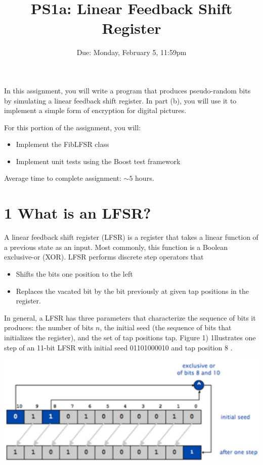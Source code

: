 \documentclass[10pt]{article}
\title{PS1a: Linear Feedback Shift Register }
\author{Due: Monday, February 5, 11:59pm}
\date{}
\begin{document}
\maketitle
In this assignment, you will write a program that produces pseudo-random bits by simulating a linear feedback shift register. In part (b), you will use it to implement a simple form of encryption for digital pictures.

For this portion of the assignment, you will:

\begin{itemize}
  \item Implement the FibLFSR class
  \item Implement unit tests using the Boost test framework
\end{itemize}

Average time to complete assignment: $\sim 5$ hours.

\section*{1 What is an LFSR?}
A linear feedback shift register (LFSR) is a register that takes a linear function of a previous state as an input. Most commonly, this function is a Boolean exclusive-or (XOR). LFSR performs discrete step operators that

\begin{itemize}
  \item Shifts the bits one position to the left
  \item Replaces the vacated bit by the bit previously at given tap positions in the register.
\end{itemize}

In general, a LFSR has three parameters that characterize the sequence of bits it produces: the number of bits $n$, the initial seed (the sequence of bits that initializes the register), and the set of tap positions tap. Figure 1) 1llustrates one step of an 11-bit LFSR with initial seed 01101000010 and tap position 8 .

\begin{center}
\includegraphics[max width=\textwidth]{2024_03_21_ddd7c97e7fb9b272aea0g-1}
\end{center}
\end{document}
